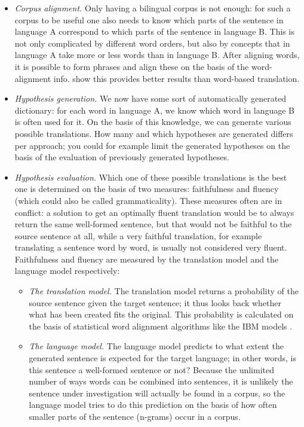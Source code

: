 \documentclass[12pt]{article}
\begin{document}
\begin{itemize}
\item \emph{Corpus alignment.} Only having a bilingual corpus is not enough: for such a corpus to be useful one also needs to know which parts of the sentence in language A correspond to which parts of the sentence in language B. This is not only complicated by different word orders, but also by concepts that in language A take more or less words than in language B. After aligning words, it is possible to form phrases and align these on the basis of the word-alignment info. \citet{koehn03} show this provides better results than word-based translation.

\item \emph{Hypothesis generation.} We now have some sort of automatically generated dictionary: for each word in language A, we know which word in language B is often used for it. On the basis of this knowledge, we can generate various possible translations. How many and which hypotheses are generated differs per approach; you could for example limit the generated hypotheses on the basis of the evaluation of previously generated hypotheses.

\item \emph{Hypothesis evaluation.} Which one of these possible translations is the best one is determined on the basis of two measures: faithfulness and fluency (which could also be called grammaticality). These measures often are in conflict: a solution to get an optimally fluent translation would be to always return the same well-formed sentence, but that would not be faithful to the source sentence at all, while a very faithful translation, for example translating a sentence word by word, is usually not considered very fluent. Faithfulness and fluency are measured by the translation model and the language model respectively:

\begin{itemize}
\item \emph{The translation model.} The translation model returns a probability of the source sentence given the target sentence; it thus looks back whether what has been created fits the original. This probability is calculated on the basis of statistical word alignment algorithms like the IBM models \citep{brown93}.

\item \emph{The language model.} The language model predicts to what extent the generated sentence is expected for the target language; in other words, is this sentence a well-formed sentence or not? Because the unlimited number of ways words can be combined into sentences, it is unlikely the sentence under investigation will actually be found in a corpus, so the language model tries to do this prediction on the basis of how often smaller parts of the sentence (n-grams) occur in a corpus.

\end{itemize}

\end{itemize}
\end{document}
